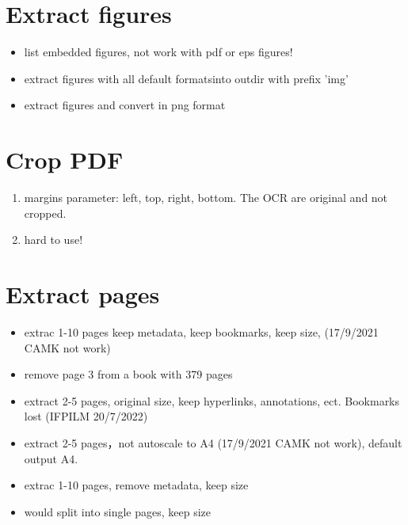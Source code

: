 \section{Extract figures}
\begin{itemize}
\item {} list embedded figures, not work with pdf or eps figures!
\item {} extract figures with all default formatsinto outdir with prefix 'img'
\item {} extract figures and convert in png format
\end{itemize}

\section{Crop PDF}
\begin{enumerate}
\item{} margins parameter: left, top, right, bottom. The OCR are original and not cropped.
\item{} hard to use!
\end{enumerate}

\section{Extract pages}
\begin{itemize}
\item{} extrac 1-10 pages keep metadata, keep bookmarks, keep size, (17/9/2021 CAMK not work)
\item{} remove page 3 from a book with 379 pages
\item{} extract 2-5 pages, original size, keep hyperlinks, annotations, ect. Bookmarks lost (IFPILM 20/7/2022)
\item{} extract 2-5 pages，not autoscale to A4 (17/9/2021 CAMK not work), default output A4. 
\item{} extrac 1-10 pages, remove metadata, keep size
\item{} would split into single pages, keep size
\end{itemize}

